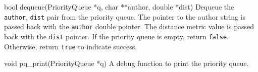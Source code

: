 \begin{funcdoc}{bool dequeue(PriorityQueue *q, char **author, double *dist)}
  Dequeue the \texttt{author}, \texttt{dist} pair from the priority queue. The
  pointer to the author string is passed back with the \texttt{author} double
  pointer. The distance metric value is passed back with the \texttt{dist}
  pointer. If the priority queue is empty, return \texttt{false}. Otherwise,
  return \texttt{true} to indicate success.
\end{funcdoc}

\begin{funcdoc}{void pq\_print(PriorityQueue *q)}
  A debug function to print the priority queue.
\end{funcdoc}
